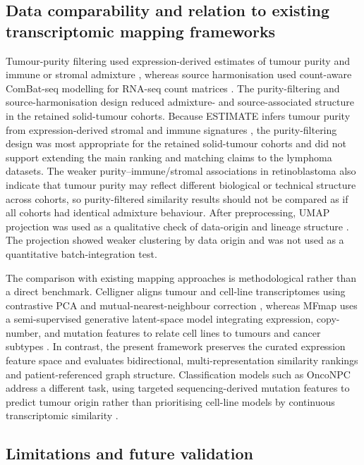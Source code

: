 \subsection{Data comparability and relation to existing transcriptomic mapping frameworks}

Tumour-purity filtering used expression-derived estimates of tumour purity and
immune or stromal admixture \citep{Yoshihara2013}, whereas source harmonisation
used count-aware ComBat-seq modelling for RNA-seq count matrices
\citep{Leek2010BatchEffects,Zhang2020ComBatSeq}.
The purity-filtering and source-harmonisation design reduced admixture- and
source-associated structure in the retained solid-tumour cohorts. Because ESTIMATE infers tumour
purity from expression-derived stromal and immune signatures
\citep{Yoshihara2013}, the purity-filtering design was most appropriate for the
retained solid-tumour cohorts and did not support extending the main ranking and
matching claims to the lymphoma datasets. The weaker
purity--immune/stromal associations in retinoblastoma also indicate that tumour
purity may reflect different biological or technical structure across cohorts,
so purity-filtered similarity results should not be compared as if all cohorts
had identical admixture behaviour. After preprocessing, UMAP projection was
used as a qualitative check of data-origin and lineage structure
\citep{McInnes2020}. The projection showed weaker clustering by data origin and
was not used as a quantitative batch-integration test.

The comparison with existing mapping approaches is methodological rather than a
direct benchmark. Celligner aligns tumour and cell-line transcriptomes using
contrastive PCA and mutual-nearest-neighbour correction
\citep{Warren2021GlobalAlignment}, whereas MFmap uses a semi-supervised
generative latent-space model integrating expression, copy-number, and mutation
features to relate cell lines to tumours and cancer subtypes
\citep{Zhang2021MFmap}. In contrast, the present framework preserves the
curated expression feature space and evaluates bidirectional,
multi-representation similarity rankings and patient-referenced graph
structure. Classification models such as OncoNPC address a different task,
using targeted sequencing-derived mutation features to predict tumour origin
rather than prioritising cell-line models by continuous transcriptomic
similarity \citep{Moon2023CUP}.

\subsection{Limitations and future validation}

